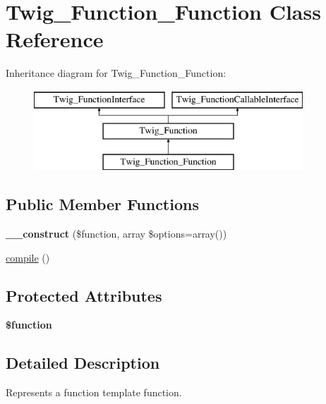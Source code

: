\hypertarget{class_twig___function___function}{}\section{Twig\+\_\+\+Function\+\_\+\+Function Class Reference}
\label{class_twig___function___function}
Inheritance diagram for Twig\+\_\+\+Function\+\_\+\+Function\+:\begin{figure}[H]
\begin{center}
\leavevmode
\includegraphics[height=3.000000cm]{class_twig___function___function}
\end{center}
\end{figure}
\subsection*{Public Member Functions}
\begin{DoxyCompactItemize}
\item 
\hypertarget{class_twig___function___function_ae6ad9907bb7237c92e880ca6bfd16469}{}{\bfseries \+\_\+\+\_\+construct} (\$function, array \$options=array())\label{class_twig___function___function_ae6ad9907bb7237c92e880ca6bfd16469}

\item 
\hyperlink{class_twig___function___function_a3815e7c2e73f00c2ebffcf5b90eef3b1}{compile} ()
\end{DoxyCompactItemize}
\subsection*{Protected Attributes}
\begin{DoxyCompactItemize}
\item 
\hypertarget{class_twig___function___function_af3e5d0d1ff43879d493dd97bb760c479}{}{\bfseries \$function}\label{class_twig___function___function_af3e5d0d1ff43879d493dd97bb760c479}

\end{DoxyCompactItemize}


\subsection{Detailed Description}
Represents a function template function.

